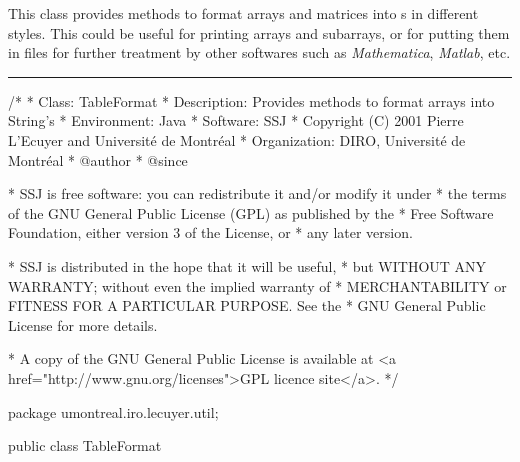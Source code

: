 
This class provides methods to format arrays and matrices into
s in different styles.
This  could be useful for printing arrays and subarrays, or for
putting them in files for further treatment by other softwares such
as {\em Mathematica\/}, {\em Matlab\/}, etc.

\bigskip\hrule

\begin{code}\begin{hide}
/*
 * Class:        TableFormat
 * Description:  Provides methods to format arrays into String's
 * Environment:  Java
 * Software:     SSJ 
 * Copyright (C) 2001  Pierre L'Ecuyer and Université de Montréal
 * Organization: DIRO, Université de Montréal
 * @author       
 * @since

 * SSJ is free software: you can redistribute it and/or modify it under
 * the terms of the GNU General Public License (GPL) as published by the
 * Free Software Foundation, either version 3 of the License, or
 * any later version.

 * SSJ is distributed in the hope that it will be useful,
 * but WITHOUT ANY WARRANTY; without even the implied warranty of
 * MERCHANTABILITY or FITNESS FOR A PARTICULAR PURPOSE.  See the
 * GNU General Public License for more details.

 * A copy of the GNU General Public License is available at
   <a href="http://www.gnu.org/licenses">GPL licence site</a>.
 */
\end{hide}
package umontreal.iro.lecuyer.util;


public class TableFormat\begin{hide} {
   private TableFormat() {}\end{hide}
\end{code}

